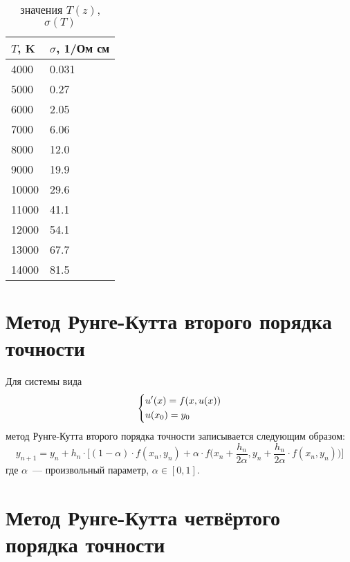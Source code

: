 \begin{table}[H]
    \centering
    \caption{значения $T(z)$, $\sigma(T)$}\label{tbl:ts}
    \begin{tabular}{|l|l|}
        \hline
        $T$, K & $\sigma$, 1/Ом см \\
        \hline
        4000   & 0.031 \\
        \hline
        5000   & 0.27  \\
        \hline
        6000   & 2.05  \\
        \hline
        7000   & 6.06  \\
        \hline
        8000   & 12.0  \\
        \hline
        9000   & 19.9  \\
        \hline
        10000  & 29.6  \\
        \hline
        11000  & 41.1  \\
        \hline
        12000  & 54.1  \\
        \hline
        13000  & 67.7  \\
        \hline
        14000  & 81.5  \\
        \hline
    \end{tabular}
\end{table}

\section{Метод Рунге-Кутта второго порядка точности}

Для системы вида
\begin{equation*}
\begin{dcases}
    u'(x) = f(x, u(x)) \\
    u(x_0) = y_0
\end{dcases}
\end{equation*}
метод Рунге-Кутта второго порядка точности записывается следующим образом:
\begin{equation*}
    y_{n + 1} = y_n + h_n \cdot \Big[ (1 - \alpha) \cdot f(x_n, y_n) + \alpha \cdot f\Big( x_n + \frac{h_n}{2\alpha}, y_n + \frac{h_n}{2\alpha} \cdot f(x_n, y_n) \Big) \Big]
\end{equation*}
где $\alpha$~--- произвольный параметр, $\alpha \in [0, 1]$.

\section{Метод Рунге-Кутта четвёртого порядка точности}

